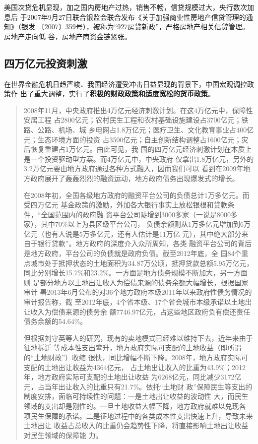 美国次贷危机显现，加之国内房地产过热，销售不畅，信贷规模过大，央行数次加息后
于2007年9月27日联合银监会联合发布《关于加强商业性房地产信贷管理的通知》（银发
〔2007〕359号），被称为“927房贷新政”，严格房地产相关信贷管理。房地产走向低
谷，房地产商资金链紧张。

\subsection{四万亿元投资刺激}

在世界金融危机日趋严峻、我国经济遭受冲击日益显现的背景下，中国宏观调控政策作
出了重大调整，实行了\textbf{积极的财政政策和适度宽松的货币政策}。


\begin{quotation}
  2008年11月，中央政府推出4万亿元经济刺激计划。在这4万亿元中，保障性安居工程
  占2800亿元；农村民生工程和农村基础设施建设占3700亿元；铁路、公路、机场、城
  乡电网占1.8万亿元；医疗卫生、文化教育事业占400亿元；生态环境方面的投资
  占3500亿元；自主创新结构调整占1600亿元；灾后恢复重建占1万亿元。由此可见，我
  国的四万亿元经济刺激计划在本质上是一个投资驱动型方案。而4万亿元中，中央政府
  仅拿出1.8万亿元，另外的3.2万亿元要由地方政府通过各种方式融入，因而我们可以
  看到在2009年地方政府展开了轰轰烈烈的融资运动，地方政府债务出现爆发式的增长。


  在2008年初，全国各级地方政府的融资平台公司的负债总计1万多亿元。而受四万亿元
  基金政策的激励，外加各大银行事实上放松银根和贷款条件，“全国范围内的政府融
  资平台公司陡增到3000多家（一说是8000多家），其中70\%以上为县区级平台公司，
  负债余额则从1万多亿元增加到6万亿元（也有人说是5万多亿元，还有人估计是11万亿
  元），其中绝大部分来自于银行贷款”。地方政府的深度介入众所周知，各类
  融资平台公司的背后是地方政府，平台公司的负债就是政府负债。截至2012年底，全
  国84个重点城市处于抵押状态的土地面积为34.87万公顷，抵押贷款总额5.95万亿元，
  同比分别增长15.7\%和23.2\%。一方面是地方债务规模不断加大，另一方面则
  是部分地方以土地出让收入为偿债来源的债务余额大幅增长，根据国家审计
  署2013年6月公布的对36个地方政府本级2011年以来政府性债务情况的审计报告称，截
  至2012年底，4个省本级、17个省会城市本级承诺以土地出让收入为偿债来源的债务余
  额7746.97亿元，占这些地区政府负有偿还责任债务余额的54.64\%。

  但根据刘守英等人的研究，现有的卖地模式已经难以维持下去，近年来由于征地拆迁
  等成本性支出攀升，地方政府实际可支配的土地收益（即所谓的“土地财政”）收缩
  很快，同比增幅不断下降。2008年，地方政府实际可支配的土地出让收益为4364亿元，
  占土地出让收入的比重为43.9\%；2012年，地方政府实际可支配的土地出让收益
  为6268亿元，同比减少3172亿元，占当年出让收入的比重只有21.7\%。依托“土地财
  政”保障民生等支出的制度安排，面临可持续性的问题：一是土地出让收益的波动性
  大，而民生领域的支出却是刚性的。一旦土地收益大幅下降，地方政府就难以兑现各
  项民生保障的承诺。二是征地过程中的各类成本性支出快速上升，导致未来土地出让
  收益占总收入的比重仍会趋势性下降，将直接影响土地出让收益对民生领域的保障能
  力。
\end{quotation}

